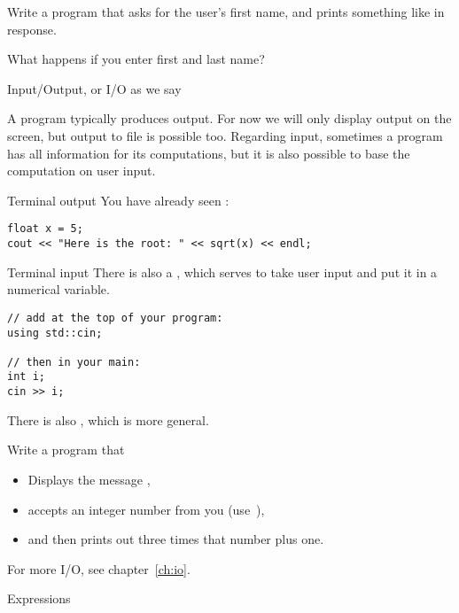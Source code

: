 \begin{exercise}
  \label{ex:ask-for-name}
  Write a program that asks for the user's first name, and prints
  something like  in response.

  What happens if you enter first and last name?
\end{exercise}

 {Input/Output, or I/O as we say}
\label{sec:io}

A program typically produces output. For now we will only display
output on the screen, but output to file is possible too.  Regarding
input, sometimes a program has all information for its computations,
but it is also possible to base the computation on user input.

\begin{block}{Terminal output}
  \label{sl:cout}
You have already seen :
\begin{verbatim}
float x = 5;
cout << "Here is the root: " << sqrt(x) << endl;
\end{verbatim}
\end{block}

\begin{block}{Terminal input}
  \label{sl:cin}
  There is also a , which serves to take user input and
  put it in a numerical variable.
\begin{verbatim}
// add at the top of your program:
using std::cin;

// then in your main:
int i;
cin >> i;
\end{verbatim}
There is also , which is more general.
\end{block}

\begin{exercise}
  \label{ex:cin-cout3np1}
  Write a program that 
  \begin{itemize}
  \item Displays the message ,
  \item accepts an integer number from you (use~),
  \item and then prints out three times that number plus one.
  \end{itemize}
\end{exercise}

For more I/O, see chapter~\ref{ch:io}.

 {Expressions}
\label{sec:expr}

